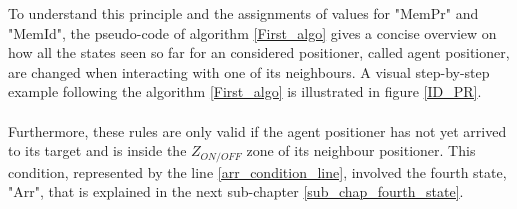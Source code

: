 \documentclass[]{spie}  %
\begin{document}
	 To understand this principle and the assignments of values for "MemPr"  and "MemId", the pseudo-code of algorithm \ref{First_algo} gives a concise overview on how all the states seen so far for an considered positioner, called agent positioner, are changed when interacting with one of its neighbours. A visual step-by-step example following the algorithm \ref{First_algo} is illustrated in figure \ref{ID_PR}. \\\\
	 Furthermore, these rules are only valid if the agent positioner has not yet arrived to its target and is inside the $Z_{ON/OFF}$ zone of its neighbour positioner. This condition, represented by the line \ref{arr_condition_line}, involved the fourth state, "Arr", that is explained in the next sub-chapter \ref{sub_chap_fourth_state}. 
 	\begin{figure}[H]
 		\centering
 		\begin{minipage}[t]{5.2cm}


\end{minipage}
\end{figure}
\end{document}
